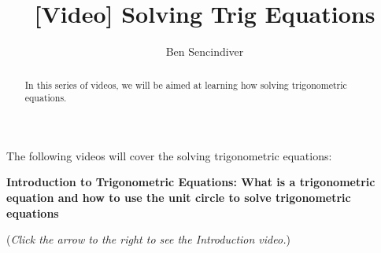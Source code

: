 \documentclass{ximera}
\title[Prerequisite Videos: ]{[Video] Solving Trig Equations}
\author{Ben Sencindiver}
\begin{document}
\begin{abstract}
  In this series of videos, we will be aimed at learning how
  solving trigonometric equations.
\end{abstract}
\maketitle

The following videos will cover the solving trigonometric equations:

\textbf{Introduction to Trigonometric Equations: What is a trigonometric
equation and how to use the unit circle to solve trigonometric equations}
\begin{explanation}
\begin{flushright}
{\color{blue}(\emph{Click the arrow to the right to see the Introduction video.})}   
\end{flushright}
\begin{center}
\begin{expandable}
\end{expandable}
\end{center}
\end{explanation}
\end{document}
